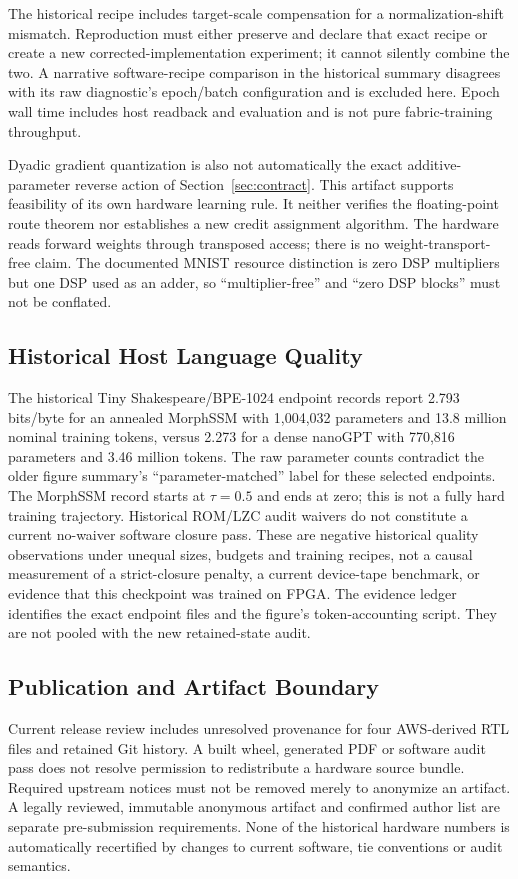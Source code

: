 The historical recipe includes target-scale compensation for a
normalization-shift mismatch. Reproduction must either preserve and declare
that exact recipe or create a new corrected-implementation experiment; it
cannot silently combine the two. A narrative software-recipe comparison in
the historical summary disagrees with its raw diagnostic's epoch/batch
configuration and is excluded here. Epoch wall time includes host readback
and evaluation and is not pure fabric-training throughput.

Dyadic gradient quantization is also not automatically the exact
additive-parameter reverse action of Section~\ref{sec:contract}. This
artifact supports feasibility of its own hardware learning rule. It neither
verifies the floating-point route theorem nor establishes a new credit
assignment algorithm. The hardware reads forward weights through
transposed access; there is no weight-transport-free claim. The documented
MNIST resource distinction is zero DSP multipliers but one DSP used as an
adder, so ``multiplier-free'' and ``zero DSP blocks'' must not be conflated.

\subsection{Historical Host Language Quality}
\label{app:host-quality}

The historical Tiny Shakespeare/BPE-1024 endpoint records report
2.793 bits/byte for an annealed MorphSSM with 1,004,032 parameters and
13.8 million nominal training tokens, versus 2.273 for a dense nanoGPT
with 770,816 parameters and 3.46 million tokens. The raw parameter counts
contradict the older figure summary's ``parameter-matched'' label for these
selected endpoints. The MorphSSM record starts at $\tau=0.5$ and ends at
zero; this is not a fully hard training trajectory. Historical ROM/LZC
audit waivers do not constitute a current no-waiver software closure pass.
These are negative historical quality observations under unequal sizes,
budgets and training recipes, not a causal measurement of a strict-closure
penalty, a current device-tape benchmark, or evidence that this checkpoint
was trained on FPGA. The evidence ledger identifies the exact endpoint
files and the figure's token-accounting script. They are not pooled with
the new retained-state audit.

\subsection{Publication and Artifact Boundary}

Current release review includes unresolved provenance for four AWS-derived
RTL files and retained Git history. A built wheel, generated PDF or software
audit pass does not resolve permission to redistribute a hardware source
bundle. Required upstream notices must not be removed merely to anonymize
an artifact. A legally reviewed, immutable anonymous artifact and confirmed
author list are separate pre-submission requirements. None of the
historical hardware numbers is automatically recertified by changes to
current software, tie conventions or audit semantics.
